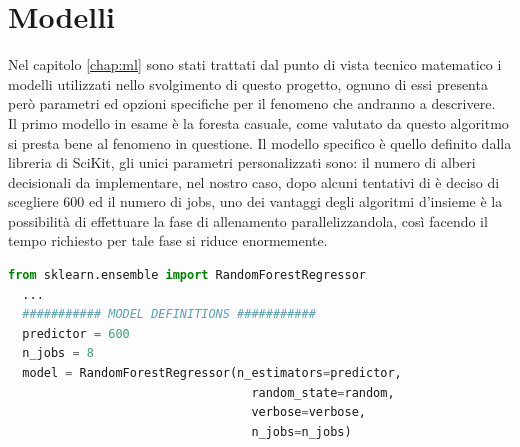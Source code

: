 \documentclass[%
    corpo=12pt,
    twoside,
    oldstyle,
    autoretitolo,
    greek,
    evenboxes,
]{toptesi}
\begin{document}
\section{Modelli}
Nel capitolo \ref{chap:ml} sono stati trattati dal punto di vista tecnico matematico i modelli utilizzati nello svolgimento di questo progetto, ognuno di essi presenta però parametri ed opzioni specifiche per il fenomeno che andranno a descrivere.\\
Il primo modello in esame è la foresta casuale, come valutato da \cite{santosh_se} \cite{Chen} \cite{super_unsuper} questo algoritmo si presta bene al fenomeno in questione. Il modello specifico è quello definito dalla libreria di SciKit, gli unici parametri personalizzati sono: il numero di alberi decisionali da implementare, nel nostro caso, dopo alcuni tentativi di è deciso di scegliere 600 ed il numero di jobs, uno dei vantaggi degli algoritmi d'insieme è la possibilità di effettuare la fase di allenamento parallelizzandola, così facendo il tempo richiesto per tale fase si riduce enormemente.
\begin{lstlisting}[language=Python, frame=single, basicstyle=\small]
  from sklearn.ensemble import RandomForestRegressor
  ...
  ########### MODEL DEFINITIONS ###########
  predictor = 600
  n_jobs = 8
  model = RandomForestRegressor(n_estimators=predictor, 
                                  random_state=random, 
                                  verbose=verbose, 
                                  n_jobs=n_jobs)
\end{lstlisting}
\end{document}
